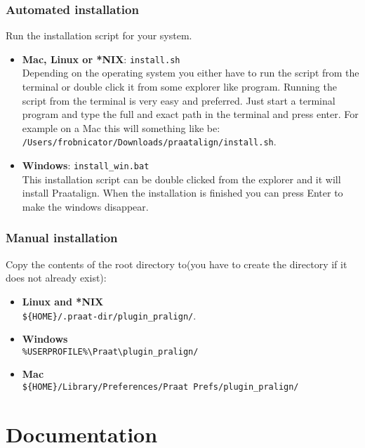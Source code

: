 \subsection{Automated installation}
Run the installation script for your system.
\begin{itemize}
	\item \textbf{Mac, Linux or *NIX}: \texttt{install.sh}\\
		Depending on the operating system you either have to run the script from
		the terminal or double click it from some explorer like program. Running
		the script from the terminal is very easy and preferred. Just start a
		terminal program and type the full and exact path in the terminal and press
		enter. For example on a Mac this will something like be:\\
		\texttt{/Users/frobnicator/Downloads/praatalign/install.sh}.
	\item \textbf{Windows}: \texttt{install\_win.bat}\\
		This installation script can be double clicked from the explorer and it
		will install Praatalign. When the installation is finished you can press
		Enter to make the windows disappear.
\end{itemize}

\subsection{Manual installation}
Copy the contents of the root directory to(you have to create the directory if
it does not already exist):
\begin{itemize}
	\item \textbf{Linux and *NIX}\\
		\texttt{\$\{HOME\}/.praat-dir/plugin\_pralign/}.
	\item \textbf{Windows}\\
		\texttt{\%USERPROFILE\%\textbackslash Praat\textbackslash plugin\_pralign/}
	\item \textbf{Mac}\\
		\texttt{\$\{HOME\}/Library/Preferences/Praat Prefs/plugin\_pralign/}
\end{itemize}

\chapter{Documentation}
